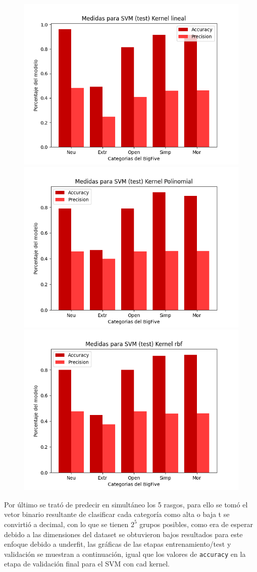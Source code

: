 \documentclass[10pt, a4paper]{article}
\begin{document}
          
            \begin{figure}[h!]
                \centering
                \includegraphics[width = 0.3\linewidth]{final_lineal.png}
                \includegraphics[width = 0.3\linewidth]{final_polinomial.png}
                \includegraphics[width = 0.3\linewidth]{final_rbf.png}

            \end{figure}

            Por \'ultimo se trat\'o de predecir en simult\'aneo los 5 rasgos, para ello se tom\'o el vetor binario resultante de 
            clasificar cada categor\'ia como alta o baja t se convirti\'o a decimal, con lo que se tienen $2^5$ grupos posibles, como era de esperar 
            debido a las dimensiones del dataset se obtuvieron bajos resultados para este enfoque debido a underfit, las gr\'aficas de las etapas entrenamiento/test y 
            validaci\'on se muestran a continuaci\'on, igual que los valores de \texttt{accuracy} en la etapa de validaci\'on final para el SVM con cad kernel. 
\end{document}
